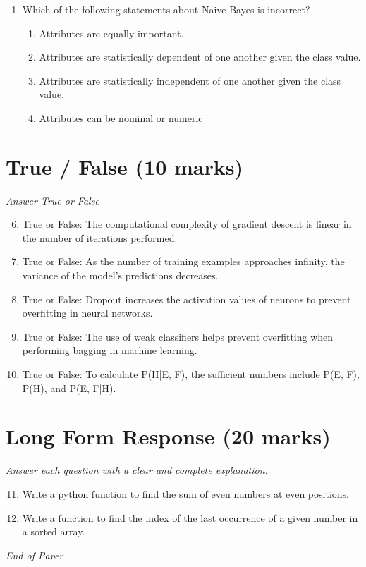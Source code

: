 \documentclass[12pt]{article}
\begin{document}
\begin{enumerate}[label=\arabic*.]
\begin{enumerate}[label=(\alph*)]
    \item Yann LeCun
    \item Stuart Russell
    \item Jitendra Malik
\end{enumerate}
\item Which of the following statements about Naive Bayes is incorrect?
\begin{enumerate}[label=(\alph*)]
    \item Attributes are equally important.
    \item Attributes are statistically dependent of one another given the class value.
    \item Attributes are statistically independent of one another given the class value.
    \item Attributes can be nominal or numeric
\end{enumerate}
\end{enumerate}

\section*{True / False (10 marks)}
\textit{Answer True or False}
\begin{enumerate}[label=\arabic*.]
\setcounter{enumi}{5}
\item True or False: The computational complexity of gradient descent is linear in the number of iterations performed.
\item True or False: As the number of training examples approaches infinity, the variance of the model's predictions decreases.
\item True or False: Dropout increases the activation values of neurons to prevent overfitting in neural networks.
\item True or False: The use of weak classifiers helps prevent overfitting when performing bagging in machine learning.
\item True or False: To calculate P(H|E, F), the sufficient numbers include P(E, F), P(H), and P(E, F|H).
\end{enumerate}

\section*{Long Form Response (20 marks)}
\textit{Answer each question with a clear and complete explanation.}
\begin{enumerate}[label=\arabic*.]
\setcounter{enumi}{10}
\item Write a python function to find the sum of even numbers at even positions.
\item Write a function to find the index of the last occurrence of a given number in a sorted array.
\end{enumerate}

\vfill
\noindent\textit{End of Paper}
\end{document}
